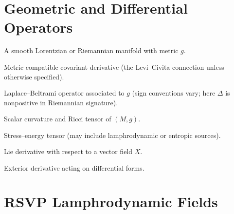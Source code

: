 \documentclass[12pt]{article}
\theoremstyle{plain}
\theoremstyle{definition}
\theoremstyle{remark}
\begin{document}
\section{Geometric and Differential Operators}

\begin{description}[leftmargin=2.5cm,style=nextline]

\item[$(M,g)$]
A smooth Lorentzian or Riemannian manifold with metric $g$.

\item[$\nabla$]
Metric-compatible covariant derivative (the Levi--Civita connection unless
otherwise specified).

\item[$\Delta = \nabla_a \nabla^a$]
Laplace--Beltrami operator associated to $g$ (sign conventions vary; here
$\Delta$ is nonpositive in Riemannian signature).

\item[$R$, $R_{ab}$]
Scalar curvature and Ricci tensor of $(M,g)$.

\item[$T_{ab}$]
Stress--energy tensor (may include lamphrodynamic or entropic sources).

\item[$\mathcal{L}_X$]
Lie derivative with respect to a vector field $X$.

\item[$d$]
Exterior derivative acting on differential forms.

\end{description}


\section{RSVP Lamphrodynamic Fields}
\end{document}
